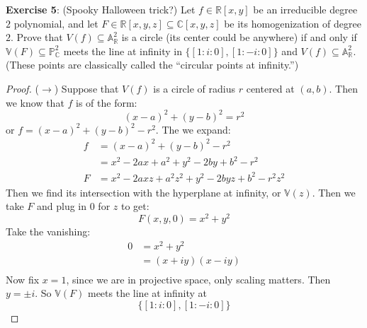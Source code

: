\documentclass{article}
\begin{document}
\textbf{Exercise 5}: (Spooky Halloween trick?) Let $f \in \mathbb{R}[x, y]$ be an irreducible degree $2$ polynomial, and let $F \in \mathbb{R}[x, y, z] \subseteq \mathbb{C}[x, y, z]$  be its homogenization of degree $2$. Prove that $V(f) \subseteq \mathbb{A}_{\mathbb{R}}^{2}$ is a circle (its center could be anywhere) if and only if $\mathbb{V}(F) \subseteq \mathbb{P}^{2}_{\mathbb{C}}$ meets the line at infinity in $\{[1 : i : 0], [1 : -i : 0]\}$ and $V(f) \subseteq \mathbb{A}_{\mathbb{R}}^{2}$. (These points are classically called the ``circular points at infinity.'')
    \begin{proof}
        ($\rightarrow$) Suppose that $V(f)$ is a circle of radius $r$ centered at $(a, b)$. Then we know that $f$ is of the form:
            \begin{equation*}
                (x - a)^{2} + (y - b)^{2} = r^{2}
            \end{equation*}
        or $f = (x - a)^{2} + (y - b)^{2} - r^{2}$. The we expand:
            \begin{align*}
                f &= (x - a)^{2} + (y - b)^{2} - r^{2}                             \\
                  &= x^{2} - 2ax + a^{2} + y^{2} - 2by + b^{2} - r^{2}             \\
                F &= x^{2} - 2axz + a^{2}z^{2} + y^{2} - 2byz + b^{2} - r^{2}z^{2}   
            \end{align*}
        Then we find its intersection with the hyperplane at infinity, or $\mathbb{V}(z)$. Then we take $F$ and plug in $0$ for $z$ to get:
            \begin{equation*}
                F(x, y, 0) = x^{2} + y^{2}
            \end{equation*}
        Take the vanishing:
            \begin{align*}
                0 &= x^{2} + y^{2}    \\
                  &= (x + iy)(x - iy) \\
            \end{align*}
        Now fix $x = 1$, since we are in projective space, only scaling matters. Then $y = \pm i$. So $\mathbb{V}(F)$ meets the line at infinity at 
            \begin{equation*}
                \{[1 : i : 0], [1 : -i : 0]\}
            \end{equation*}


\end{proof}
\end{document}
